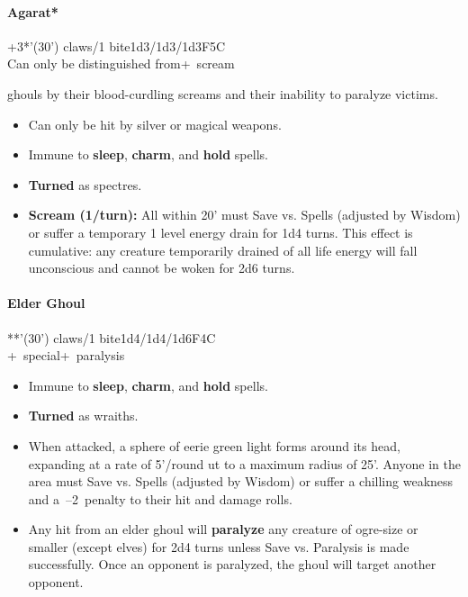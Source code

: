 \documentclass[english,11pt,openany,letterpaper,twocolumn]{book}
\begin{document}
\skipline

\hypertarget{agarat}{}
\paragraph{Agarat*}
+3*'(30') claws/1 bite\tab 1d3/1d3/1d3\tab F5\tab C
\\Can only be distinguished from+~scream

ghouls by their blood-curdling screams and their inability to paralyze victims.
\begin{itemize}[leftmargin=*,label=\itshape\textbullet]
\item
Can only be hit by silver or magical weapons.
\item
Immune to \textbf{sleep}, \textbf{charm}, and \textbf{hold} spells.
\item
\textbf{Turned} as spectres.
\item
\textbf{Scream (1/turn):} All within 20' must Save vs. Spells (adjusted by Wisdom) or suffer a temporary 1 level energy drain for 1d4 turns. This effect is cumulative: any creature temporarily drained of all life energy will fall unconscious and cannot be woken for 2d6 turns.
\end{itemize}


\skipline
\hypertarget{elder-ghoul}{}
\paragraph{Elder Ghoul}
**'(30') claws/1 bite\tab 1d4/1d4/1d6\tab F4\tab C
\\+~special\tab +~paralysis

\begin{itemize}[leftmargin=*,label=\itshape\textbullet]
\item
Immune to \textbf{sleep}, \textbf{charm}, and \textbf{hold} spells.
\item
\textbf{Turned} as wraiths.
\item
When attacked, a sphere of eerie green light forms around its head, expanding at a rate of 5'/round ut to a maximum radius of 25'. Anyone in the area must Save vs. Spells (adjusted by Wisdom) or suffer a chilling weakness and a~--2~penalty to their hit and damage rolls.
\item
Any hit from an elder ghoul will \textbf{paralyze} any creature of ogre-size or smaller (except elves) for 2d4 turns unless Save vs. Paralysis is made successfully. Once an opponent is paralyzed, the ghoul will target another opponent.
\end{itemize}
\end{document}
